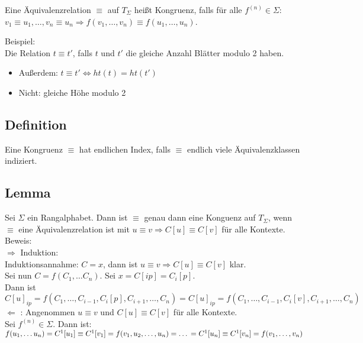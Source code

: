 \documentclass[titlepage]{article}
\begin{document}
Eine \"Aquivalenzrelation $\equiv$ auf $T_\Sigma$ hei\ss t Kongruenz, 
falls f\"ur alle $f^{(n)} \in \Sigma$: \\

$v_1 \equiv u_1, \dots, v_n \equiv u_n \Rightarrow f(v_1, \dots, v_n) \equiv 
f(u_1, \dots, u_n)$.

Beispiel:\\
Die Relation $t \equiv t'$, falls $t$ und $t'$ die gleiche Anzahl Bl\"atter modulo 2 haben.

\begin{itemize}
    \item Au\ss erdem: $t \equiv t' \Leftrightarrow ht(t) = ht(t')$
    \item Nicht: gleiche H\"ohe modulo 2
\end{itemize}

\subsection{Definition}

Eine Kongruenz $\equiv$ hat endlichen Index, falls $\equiv$ endlich viele 
\"Aquivalenzklassen indiziert.

\subsection{Lemma}

Sei $\Sigma$ ein Rangalphabet. Dann ist $\equiv$ genau dann eine Konguenz auf $T_\Sigma$, 
wenn $\equiv$ eine \"Aquivalenzrelation ist mit
$u \equiv v \Rightarrow C[u] \equiv C[v]$ f\"ur alle Kontexte.\\

Beweis:\\
\glqq $\Rightarrow$ \grqq Induktion:\\
Induktionsannahme: $C = x$, dann ist $u \equiv v \Rightarrow C[u] \equiv C[v]$ klar.\\
Sei nun $C = f(C_1, \dots C_n)$. Sei $x = C[ip] = C_i[p]$.\\
Dann ist $C[u]_{ip} = f(C_1, \dots, C_{i-1}, C_i[p], C_{i+1}, \dots, C_n) = C[u]_{ip} = 
f(C_1, \dots, C_{i-1}, C_i[v], C_{i+1}, \dots, C_n)$
\\

\glqq $\Leftarrow$ \grqq: Angenommen $u \equiv v$ und $C[u] \equiv C[v]$ f\"ur alle 
Kontexte.\\
Sei $f^{(n)} \in \Sigma$. Dann ist:\\
$f(u_1, \dots u_n)\\
= C^1[u_1] \equiv C^1[v_1] = f(v_1, u_2, \dots, u_n)\\
= \dots\\
= C^1[u_n] \equiv C^1[v_n] = f(v_1, \dots, v_n)$
\end{document}
